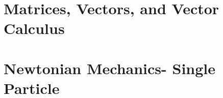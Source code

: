 \documentclass[a4paper]{article}
\begin{document}
    \section{Matrices, Vectors, and Vector Calculus}
    
    
    
    
    
    
    
    
    
    
    
    
    
    
    
    
    
    \section{Newtonian Mechanics- Single Particle}
    
    
    
\end{document}
